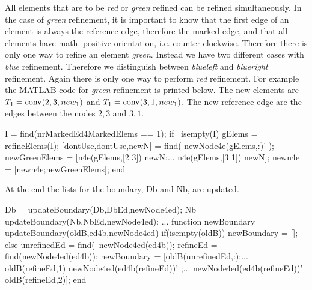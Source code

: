 \noindent
All elements that are to be \emph{red} or \emph{green} refined can be refined simultaneously.
In the case of \emph{green} refinement, it is important to know that the first edge of an element is 
always the reference edge, therefore the marked edge, and that all elements have math. positive 
orientation, i.e. counter clockwise. Therefore there is only one
way to refine an element \emph{green}. 
Instead we have two different cases with \emph{blue} refinement. 
Therefore we distinguish between \emph{blueleft} and \emph{blueright}
refinement. Again there is only one way to perform \emph{red} refinement.
For example the MATLAB code for \emph{green} refinement is
printed below. The new elements are 
$T_1=\operatorname{conv}(2,3,new_1)$ and $T_1=\operatorname{conv}(3,1,new_1)$.
The new reference edge are the edges between the nodes
$2,3$ and $3,1$.
\begin{pcode}
I = find(nrMarkedEd4MarkedElems == 1);
if ~isempty(I)
  gElems = refineElems(I);
  [dontUse,dontUse,newN] = find( newNode4e(gElems,:)' );
  newGreenElems = [n4e(gElems,[2 3]) newN;...
                   n4e(gElems,[3 1]) newN];
  newn4e = [newn4e;newGreenElems];
end
\end{pcode}
%
At the end the lists for the boundary, Db and Nb, are
updated.
\begin{pcode}
Db = updateBoundary(Db,DbEd,newNode4ed);
Nb = updateBoundary(Nb,NbEd,newNode4ed);
...
function newBoundary = updateBoundary(oldB,ed4b,newNode4ed)
if(isempty(oldB))
    newBoundary = [];
else
  unrefinedEd = find(~newNode4ed(ed4b));
  refineEd = find(newNode4ed(ed4b));
  newBoundary = [oldB(unrefinedEd,:);...
    oldB(refineEd,1) newNode4ed(ed4b(refineEd))' ;...
    newNode4ed(ed4b(refineEd))' oldB(refineEd,2)];
end
\end{pcode}
